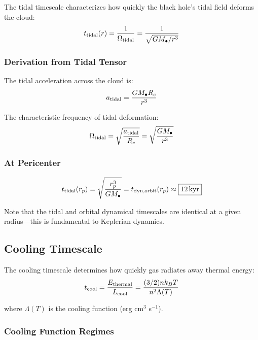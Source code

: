 \documentclass[twocolumn,amsmath,amssymb,prd,superscriptaddress,nofootinbib]{revtex4-2}
\begin{document}
The tidal timescale characterizes how quickly the black hole's tidal field deforms the cloud:
\begin{equation}
    t_{\rm tidal}(r) = \frac{1}{\Omega_{\rm tidal}} = \frac{1}{\sqrt{GM_\bullet/r^3}}
    \label{eq:t_tidal}
\end{equation}

\subsubsection{Derivation from Tidal Tensor}

The tidal acceleration across the cloud is:
\begin{equation}
    a_{\rm tidal} = \frac{GM_\bullet R_c}{r^3}
\end{equation}

The characteristic frequency of tidal deformation:
\begin{equation}
    \Omega_{\rm tidal} = \sqrt{\frac{a_{\rm tidal}}{R_c}} = \sqrt{\frac{GM_\bullet}{r^3}}
\end{equation}

\subsubsection{At Pericenter}

\begin{equation}
    t_{\rm tidal}(r_p) = \sqrt{\frac{r_p^3}{GM_\bullet}} = t_{\rm dyn,orbit}(r_p) \approx \boxed{12\,{\rm kyr}}
\end{equation}

Note that the tidal and orbital dynamical timescales are identical at a given radius---this is fundamental to Keplerian dynamics.

\subsection{Cooling Timescale}
\label{sec:t_cool}

The cooling timescale determines how quickly gas radiates away thermal energy:
\begin{equation}
    t_{\rm cool} = \frac{E_{\rm thermal}}{L_{\rm cool}} = \frac{(3/2) n k_B T}{n^2 \Lambda(T)}
    \label{eq:t_cool}
\end{equation}

where $\Lambda(T)$ is the cooling function (erg cm$^3$ s$^{-1}$).

\subsubsection{Cooling Function Regimes}
\end{document}
